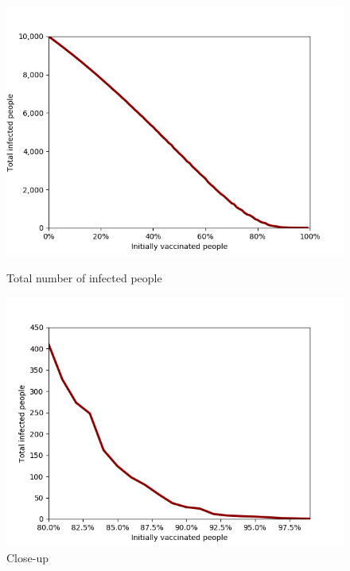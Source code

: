 \documentclass[11pt]{article}
\begin{document}
\begin{figure}
\centering
\begin{minipage}{.5\textwidth}
  \centering
  \includegraphics[width=1\linewidth]{shorttermwhole}
  \caption{Total number of infected people}  
  \label{fig:5}
  
\end{minipage}%
\begin{minipage}{.5\textwidth}
  \centering
  \includegraphics[width=1\linewidth]{shorttermclose}
  \caption{Close-up}
  \label{fig:6}
 
\end{minipage}%
\end{figure}
\end{document}
